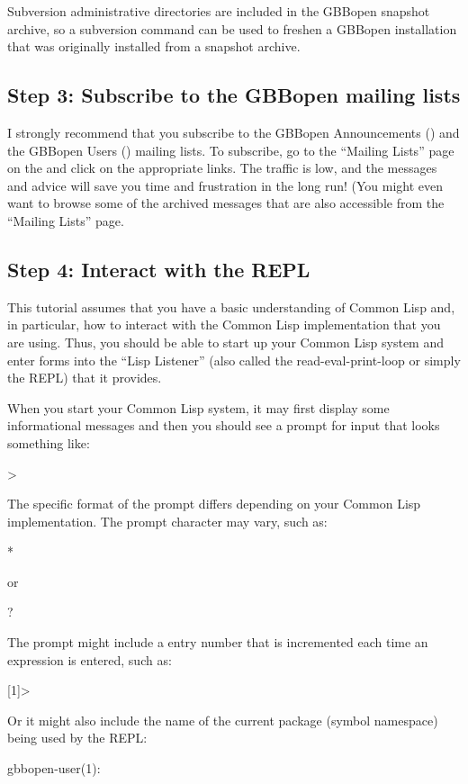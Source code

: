 \documentclass[10pt,twoside,english,pdftex]{article}
\begin{document}
Subversion  administrative directories are included in the
GBBopen snapshot archive, so a subversion  command can be
used to freshen a GBBopen installation that was originally installed
from a snapshot archive.

\subsection*{Step 3: Subscribe to the GBBopen mailing lists}

%
I strongly recommend that you subscribe to the GBBopen Announcements
() and the GBBopen Users ()
mailing lists.  To subscribe, go to the ``Mailing Lists'' page on the
 and click on the
appropriate  links.  The traffic is low, and the
messages and advice will save you time and frustration in the long
run!  (You might even want to browse some of the archived messages
that are also accessible from the ``Mailing Lists'' page.

\subsection*{Step 4: Interact with the REPL}

%
This tutorial assumes that you have a basic understanding of Common Lisp and,
in particular, how to interact with the Common Lisp implementation that you
are using.  Thus, you should be able to start up your Common Lisp system and
enter forms into the ``Lisp Listener'' (also called the read-eval-print-loop
or simply the REPL) that it provides.  

When you start your Common Lisp system, it may first display some informational
messages and then you should see a prompt for input that looks something like:
%
\begin{example}\color{darkergray}%
  > 
\end{example}
%
The specific format of the prompt differs depending on your Common Lisp
implementation.  The prompt character may vary, such as:
%
\begin{example}\color{darkergray}%
  * 
\end{example}
%
or
%
\begin{example}\color{darkergray}%
  ? 
\end{example}
%
The prompt might include a entry number that is incremented each time an
expression is entered, such as:
%
\begin{example}\color{darkergray}%
  [1]> 
\end{example}
%
Or it might also include the name of the current package (symbol namespace)
being used by the REPL:
%
\begin{example}\color{darkergray}%
  gbbopen-user(1): 
\end{example}
\end{document}
